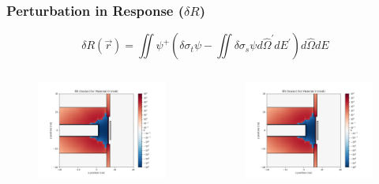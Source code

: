 \documentclass[t]{beamer}
\begin{document}
\begin{frame}
  \frametitle{Perturbation in Response ($\delta R$)}
  \vskip-0.25in
  \begin{equation}
    \delta R\left(\vec{r}\right) = \iint\psi^+\left(\delta\sigma_t\psi - \iint\delta\sigma_s\psi d\hat{\Omega}^\prime dE^\prime\right)d\hat{\Omega}dE
  \end{equation}
  \vskip-0.25in
  \begin{columns}
    \begin{figure}
      \includegraphics[trim={0.7in 0.15in 1.05in 0.4in},clip,scale=0.36]{images/dR_scalar_00.png}
    \end{figure}
    \begin{figure}
      \includegraphics[trim={0.7in 0.15in 1.05in 0.4in},clip,scale=0.36]{images/dR_scalar_00.png}
    \end{figure}
  \end{columns}
\end{frame}
\end{document}
